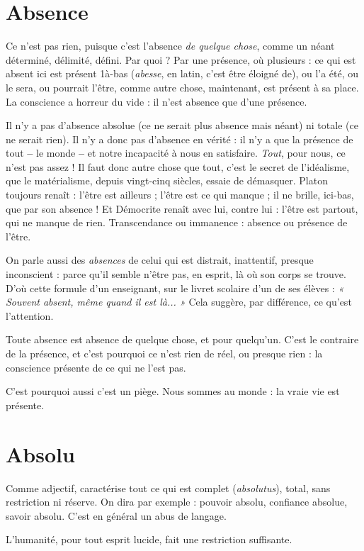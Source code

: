 \section{Absence}
Ce n’est pas rien, puisque c’est l'absence {\it de quelque chose}, comme
un néant déterminé, délimité, défini. Par quoi ? Par une présence,
où plusieurs : ce qui est absent ici est présent 1à-bas ({\it abesse}, en latin, c'est
être éloigné de), ou l’a été, ou le sera, ou pourrait l’être, comme autre chose,
maintenant, est présent à sa place. La conscience a horreur du vide : il n’est
absence que d’une présence.

Il n’y a pas d’absence absolue (ce ne serait plus absence mais néant) ni totale
(ce ne serait rien). Il n’y a donc pas d’absence en vérité : il n’y a que la présence
de tout {\bf --} le monde {\bf --} et notre incapacité à nous en satisfaire. {\it Tout}, pour nous, ce
n'est pas assez ! Il faut donc autre chose que tout, c’est le secret de l’idéalisme, que
le matérialisme, depuis vingt-cinq siècles, essaie de démasquer. Platon toujours
renaît : l'être est ailleurs ; l'être est ce qui manque ; il ne brille, ici-bas, que par son
absence ! Et Démocrite renaît avec lui, contre lui : l’être est partout, qui ne
manque de rien. Transcendance ou immanence : absence ou présence de l'être.

On parle aussi des {\it absences} de celui qui est distrait, inattentif, presque
inconscient : parce qu’il semble n’être pas, en esprit, là où son corps se trouve.
D'où cette formule d’un enseignant, sur le livret scolaire d’un de ses élèves :
{\it « Souvent absent, même quand il est là... »} Cela suggère, par différence, ce qu’est
l'attention.

Toute absence est absence de quelque chose, et pour quelqu’un. C’est le
contraire de la présence, et c’est pourquoi ce n’est rien de réel, ou presque rien :
la conscience présente de ce qui ne l’est pas.

C’est pourquoi aussi c’est un piège. Nous sommes au monde : la vraie vie
est présente.

\section{Absolu}
Comme adjectif, caractérise tout ce qui est complet ({\it absolutus}),
total, sans restriction ni réserve. On dira par exemple : pouvoir
absolu, confiance absolue, savoir absolu. C’est en général un abus de langage.

L'humanité, pour tout esprit lucide, fait une restriction suffisante.


